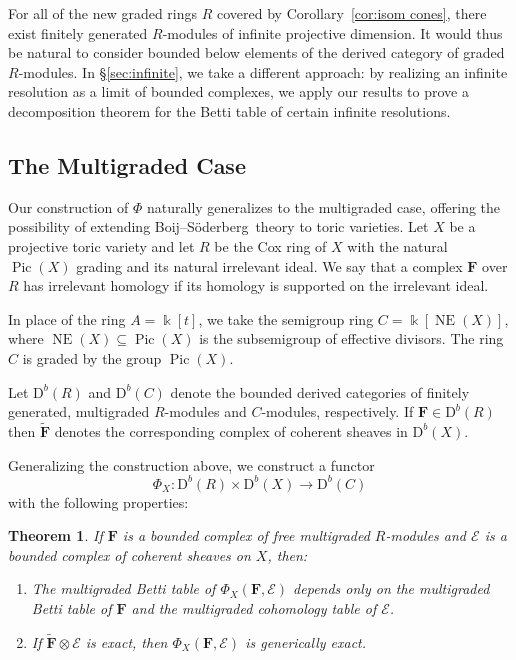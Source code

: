 \documentclass[12pt]{amsart}
\newtheorem{theorem}[lemma]{Theorem}
\theoremstyle{definition}
\theoremstyle{remark}
\newcommand{\Pic}{\operatorname{Pic}}
\newcommand{\NE}{\operatorname{NE}}
\newcommand{\kk}{\Bbbk}
\newcommand{\PP}{\mathbb{P}}
\newcommand{\cO}{\mathcal{O}}
\newcommand{\cE}{\mathcal{E}}
\newcommand{\FF}{\mathbf{F}}
\newcommand{\defi}[1]{\textsf{#1}} %
\newcommand{\DD}{\mathrm{D}}
\def\BS{Boij--S\"oderberg~}
\begin{document}

For all of the new graded rings $R$ covered by Corollary~\ref{cor:isom cones}, there exist finitely generated $R$-modules of infinite projective dimension.  It would thus be natural to consider bounded below elements of the derived category of graded $R$-modules.  In \S\ref{sec:infinite}, we take a different approach: by realizing an infinite resolution as a limit of bounded complexes, we apply our results to prove a decomposition theorem for the Betti table of certain infinite resolutions.

\subsection*{The Multigraded Case}
Our construction of $\Phi$ naturally generalizes to the multigraded case, offering the possibility of extending \BS theory to toric varieties.  Let $X$ be a projective toric variety and let $R$ be the Cox ring of $X$ with the natural $\Pic(X)$ grading and its natural irrelevant ideal. We say that a complex $\FF$ over $R$ has \defi{irrelevant homology} if its homology is supported on the irrelevant ideal.

In place of the ring $A=\kk[t]$, we take the semigroup ring $C=\kk[\NE(X)]$, where $\NE(X)\subseteq \Pic(X)$ is the subsemigroup of effective divisors.  %
The ring $C$ is graded by the group $\Pic(X)$.

Let $\DD^b(R)$ and $\DD^b(C)$ denote the bounded derived categories of finitely generated, multigraded $R$-modules and $C$-modules, respectively.   
If $\FF\in \DD^b(R)$ then $\widetilde{\FF}$  denotes the corresponding complex of coherent sheaves in $\DD^b(X)$.  


Generalizing the construction above, we construct a functor
\[
\Phi_{X}: \DD^b(R)\times \DD^b(X)\to \DD^b(C)
\]
with the following properties:
\begin{theorem}\label{thm:Phimulti}
If $\FF$ is a bounded complex of free multigraded $R$-modules and $\cE$ is a bounded complex of coherent sheaves on $X$, then:
\begin{enumerate} 
	\item\label{thm:Phi':1}  The multigraded Betti table of $\Phi_{X}(\FF,\cE)$ depends only on the multigraded Betti table of $\FF$ and the multigraded cohomology table of $\cE$.
	\item\label{thm:Phi':2}  If $\widetilde{\FF}\otimes \cE$ is exact, then $\Phi_{X}(\FF,\cE)$ is generically exact.  
\end{enumerate}
\end{theorem}
\end{document}
